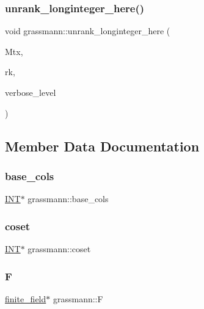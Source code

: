 \subsubsection{\texorpdfstring{unrank\+\_\+longinteger\+\_\+here()}{unrank\_longinteger\_here()}}
{\footnotesize\ttfamily void grassmann\+::unrank\+\_\+longinteger\+\_\+here (\begin{DoxyParamCaption}\item[{\mbox{\hyperlink{galois_8h_a09fddde158a3a20bd2dcadb609de11dc}{I\+NT}} $\ast$}]{Mtx,  }\item[{\mbox{\hyperlink{classlonginteger__object}{longinteger\+\_\+object}} \&}]{rk,  }\item[{\mbox{\hyperlink{galois_8h_a09fddde158a3a20bd2dcadb609de11dc}{I\+NT}}}]{verbose\+\_\+level }\end{DoxyParamCaption})}



\subsection{Member Data Documentation}
\mbox{\label{classgrassmann_a3327e327acf328cce1b981598cb9a67c}} 
\subsubsection{\texorpdfstring{base\+\_\+cols}{base\_cols}}
{\footnotesize\ttfamily \mbox{\hyperlink{galois_8h_a09fddde158a3a20bd2dcadb609de11dc}{I\+NT}}$\ast$ grassmann\+::base\+\_\+cols}

\mbox{\label{classgrassmann_aa519c9a9bc3be4ca8f8b27e1e8b3281e}} 
\subsubsection{\texorpdfstring{coset}{coset}}
{\footnotesize\ttfamily \mbox{\hyperlink{galois_8h_a09fddde158a3a20bd2dcadb609de11dc}{I\+NT}}$\ast$ grassmann\+::coset}

\mbox{\label{classgrassmann_ada0f668336cc7643fd7597d9099c3314}} 
\subsubsection{\texorpdfstring{F}{F}}
{\footnotesize\ttfamily \mbox{\hyperlink{classfinite__field}{finite\+\_\+field}}$\ast$ grassmann\+::F}

